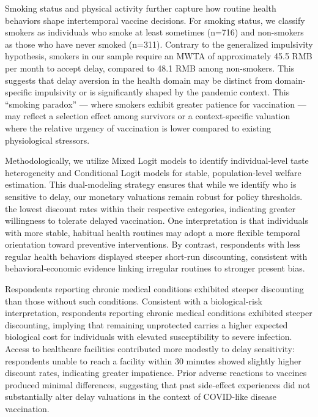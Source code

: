 \documentclass[preprint,12pt]{elsarticle}
\begin{document}
Smoking status and physical activity further capture how routine health behaviors
shape intertemporal vaccine decisions. For smoking status, we classify smokers as individuals who smoke at least sometimes (n=716) and non-smokers as those who have never smoked (n=311).
Contrary to the generalized impulsivity hypothesis, smokers in our sample require an MWTA of approximately 45.5 RMB per month to accept delay, compared to 48.1 RMB among non-smokers.
This suggests that delay aversion in the health domain may be distinct from domain-specific impulsivity or is significantly shaped by the pandemic context. This ``smoking paradox'' --- where smokers exhibit greater patience for vaccination --- may reflect a selection effect among survivors or a context-specific valuation where the relative urgency of vaccination is lower compared to existing physiological stressors.

Methodologically, we utilize Mixed Logit models to identify individual-level taste heterogeneity and Conditional Logit models for stable, population-level welfare estimation. This dual-modeling strategy ensures that while we identify who is sensitive to delay, our monetary valuations remain robust for policy thresholds.
the lowest discount rates within their respective categories, indicating greater willingness to
tolerate delayed vaccination. One interpretation is that individuals with more stable, habitual
health routines may adopt a more flexible temporal orientation toward preventive interventions.
By contrast, respondents with less regular health behaviors displayed steeper short-run
discounting, consistent with behavioral-economic evidence linking irregular routines to
stronger present bias.

Respondents reporting chronic medical conditions exhibited steeper discounting than those
without such conditions. Consistent with a biological-risk interpretation, respondents
reporting chronic medical conditions exhibited steeper discounting, implying that remaining
unprotected carries a higher expected biological cost for individuals with elevated
susceptibility to severe infection. Access to healthcare facilities contributed more modestly to
delay sensitivity: respondents unable to reach a facility within 30 minutes showed slightly
higher discount rates, indicating greater impatience. Prior adverse reactions to vaccines
produced minimal differences, suggesting that past side-effect experiences did not
substantially alter delay valuations in the context of COVID-like disease vaccination.
\end{document}
